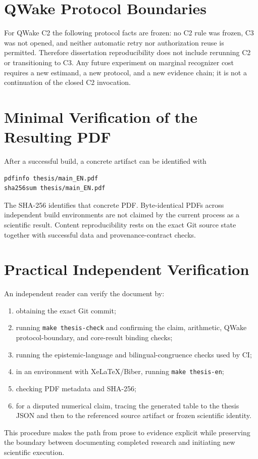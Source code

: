

\section{QWake Protocol Boundaries}

For QWake C2 the following protocol facts are frozen: no C2 rule was frozen, C3 was
not opened, and neither automatic retry nor authorization reuse is permitted.
Therefore dissertation reproducibility does not include rerunning C2 or transitioning
to C3. Any future experiment on marginal recognizer cost requires a new estimand, a
new protocol, and a new evidence chain; it is not a continuation of the closed C2
invocation.

\section{Minimal Verification of the Resulting PDF}

After a successful build, a concrete artifact can be identified with
\begin{verbatim}
pdfinfo thesis/main_EN.pdf
sha256sum thesis/main_EN.pdf
\end{verbatim}
The SHA-256 identifies that concrete PDF. Byte-identical PDFs across independent build
environments are not claimed by the current process as a scientific result. Content
reproducibility rests on the exact Git source state together with successful data and
provenance-contract checks.

\section{Practical Independent Verification}

An independent reader can verify the document by:
\begin{enumerate}
  \item obtaining the exact Git commit;
  \item running \texttt{make thesis-check} and confirming the claim, arithmetic, QWake protocol-boundary, and core-result binding checks;
  \item running the epistemic-language and bilingual-congruence checks used by CI;
  \item in an environment with XeLaTeX/Biber, running \texttt{make thesis-en};
  \item checking PDF metadata and SHA-256;
  \item for a disputed numerical claim, tracing the generated table to the thesis JSON and then to the referenced source artifact or frozen scientific identity.
\end{enumerate}
This procedure makes the path from prose to evidence explicit while preserving the
boundary between documenting completed research and initiating new scientific
execution.
